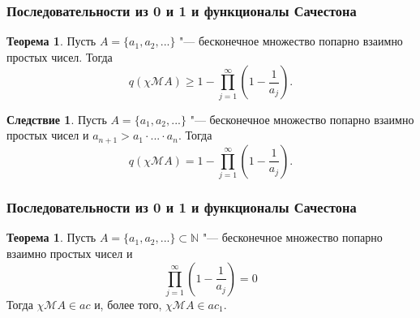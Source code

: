 \documentclass[10pt,pdf,hyperref={unicode},aspectratio=169,color={usenames, dvipsnames}]{beamer}\usepackage{amsmath}
\theoremstyle{definition}
\newtheorem{ttheorem}[llemma]{Теорема}
\newtheorem{ccorollary}{Следствие}[llemma]
\begin{document}
\begin{frame}
	\frametitle{Последовательности из 0 и 1 и функционалы Сачестона}

	\begin{ttheorem}
		\label{thm:ac0_primes_p_psi_A_prod}
		Пусть $A = \{a_1, a_2, ...\}$ "--- бесконечное множество попарно взаимно простых чисел.
		Тогда
		\begin{equation}
			q(\chi\mathscr{M}A) \geq 1-\prod_{j=1}^\infty \left(1-\frac{1}{a_j}\right)
			.
		\end{equation}
	\end{ttheorem}
	\begin{ccorollary}
		\label{cor:ac0_primes_p_psi_A_prod}
		Пусть $A = \{a_1, a_2, ...\}$ "--- бесконечное множество попарно взаимно простых чисел
		и $a_{n+1}>a_1\cdot...\cdot a_n$.
		Тогда
		\begin{equation}
			q(\chi\mathscr{M}A) = 1-\prod_{j=1}^\infty \left(1-\frac{1}{a_j}\right)
			.
		\end{equation}
	\end{ccorollary}
\end{frame}

\begin{frame}
	\frametitle{Последовательности из 0 и 1 и функционалы Сачестона}
	\begin{ttheorem}
		Пусть $A=\{a_1, a_2, ... \}\subset\mathbb{N}$ "--- бесконечное множество попарно взаимно простых чисел
		и
		\begin{equation}
			\label{eq:prod_causes_q}
			\prod_{j=1}^\infty \left(1-\frac{1}{a_j}\right) = 0
		\end{equation}
		Тогда $\chi\mathscr{M}A\in ac$ и, более того, $\chi\mathscr{M}A\in ac_1$.
	\end{ttheorem}

\end{frame}


\def\rinc{\color[rgb]{0.5,0,0}{(РИНЦ)~}}
\def\vak{\color[rgb]{0.5,0.5,0}{(ВАК)~}}
\def\mzm{\color[rgb]{0,0.5,0}{(WoS)~(Scopus)~}}

\end{document}
